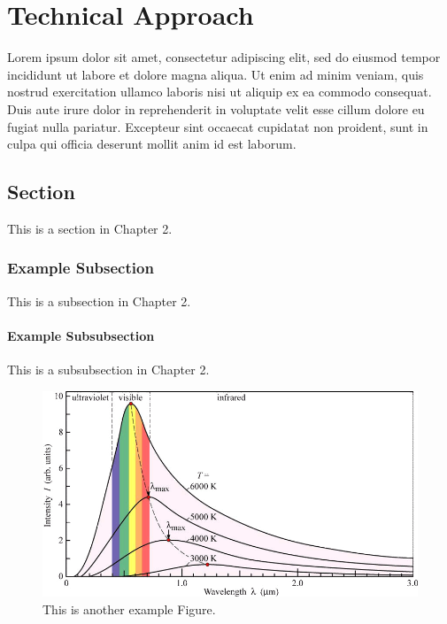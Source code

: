 \chapter{Technical Approach}
Lorem ipsum dolor sit amet, consectetur adipiscing elit, sed do eiusmod tempor incididunt ut labore et dolore magna aliqua. Ut enim ad minim veniam, quis nostrud exercitation ullamco laboris nisi ut aliquip ex ea commodo consequat. Duis aute irure dolor in reprehenderit in voluptate velit esse cillum dolore eu fugiat nulla pariatur. Excepteur sint occaecat cupidatat non proident, sunt in culpa qui officia deserunt mollit anim id est laborum.

\section{Section}

This is a section in Chapter 2.

\subsection{Example Subsection}

This is a subsection in Chapter 2.

\subsubsection{Example Subsubsection}

This is a subsubsection in Chapter 2.

\begin{figure}
\includegraphics[width=\textwidth]{figures/exampleFigure.png}
\caption{This is another example Figure.}
\label{LandscapeFigure}
\end{figure}
